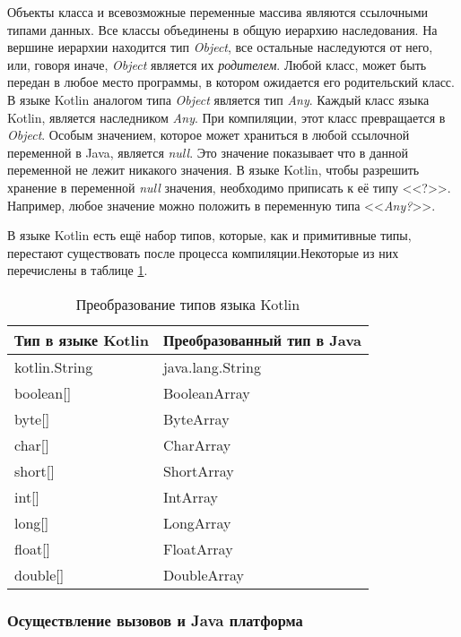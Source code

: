 Объекты класса и всевозможные переменные массива являются ссылочными типами данных. Все классы объединены в общую иерархию наследования. На вершине иерархии находится тип \textit{Object}, все остальные наследуются от него, или, говоря иначе, \textit{Object} является их \textit{родителем}. Любой класс, может быть передан в любое место программы, в котором ожидается его родительский класс. В языке Kotlin аналогом типа \textit{Object} является тип \textit{Any}. Каждый класс языка Kotlin, является наследником \textit{Any}. При компиляции, этот класс превращается в \textit{Object}.
Особым значением, которое может храниться в любой ссылочной переменной в Java, является \textit{null}. Это значение показывает что в данной переменной не лежит никакого значения. В языке Kotlin, чтобы разрешить хранение в переменной \textit{null} значения, необходимо приписать к её типу <<?>>. Например, любое значение можно положить в переменную типа <<\textit{Any?}>>.

В языке Kotlin есть ещё набор типов, которые, как и примитивные типы, перестают существовать после процесса компиляции.Некоторые из них перечислены в таблице \ref{tab:kotlinTypeConversion}.

\begin{table}[h]
\caption{\label{tab:kotlinTypeConversion}Преобразование типов языка Kotlin}
\begin{center}
\begin{tabular}{|l|l|}
\hline
Тип в языке Kotlin & Преобразованный тип в Java \\
\hline
kotlin.String & java.lang.String \\
boolean[]  & BooleanArray  \\
byte[]  & ByteArray \\
char[]  & CharArray \\
short[]  & ShortArray \\
int[] & IntArray \\
long[] &  LongArray \\
float[] & FloatArray \\
double[] & DoubleArray \\
\hline
\end{tabular}
\end{center}
\end{table}

\subsubsection{Осуществление вызовов и Java платформа}

